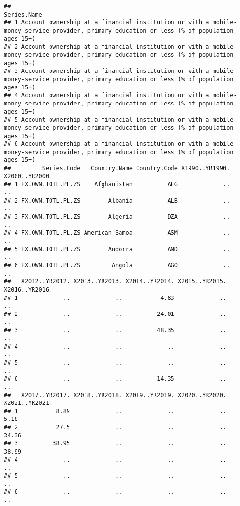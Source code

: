 \documentclass[
]{article}
\begin{document}
\begin{verbatim}
##                                                                                                                                  Series.Name
## 1 Account ownership at a financial institution or with a mobile-money-service provider, primary education or less (% of population ages 15+)
## 2 Account ownership at a financial institution or with a mobile-money-service provider, primary education or less (% of population ages 15+)
## 3 Account ownership at a financial institution or with a mobile-money-service provider, primary education or less (% of population ages 15+)
## 4 Account ownership at a financial institution or with a mobile-money-service provider, primary education or less (% of population ages 15+)
## 5 Account ownership at a financial institution or with a mobile-money-service provider, primary education or less (% of population ages 15+)
## 6 Account ownership at a financial institution or with a mobile-money-service provider, primary education or less (% of population ages 15+)
##         Series.Code   Country.Name Country.Code X1990..YR1990. X2000..YR2000.
## 1 FX.OWN.TOTL.PL.ZS    Afghanistan          AFG             ..             ..
## 2 FX.OWN.TOTL.PL.ZS        Albania          ALB             ..             ..
## 3 FX.OWN.TOTL.PL.ZS        Algeria          DZA             ..             ..
## 4 FX.OWN.TOTL.PL.ZS American Samoa          ASM             ..             ..
## 5 FX.OWN.TOTL.PL.ZS        Andorra          AND             ..             ..
## 6 FX.OWN.TOTL.PL.ZS         Angola          AGO             ..             ..
##   X2012..YR2012. X2013..YR2013. X2014..YR2014. X2015..YR2015. X2016..YR2016.
## 1             ..             ..           4.83             ..             ..
## 2             ..             ..          24.01             ..             ..
## 3             ..             ..          48.35             ..             ..
## 4             ..             ..             ..             ..             ..
## 5             ..             ..             ..             ..             ..
## 6             ..             ..          14.35             ..             ..
##   X2017..YR2017. X2018..YR2018. X2019..YR2019. X2020..YR2020. X2021..YR2021.
## 1           8.89             ..             ..             ..           5.18
## 2           27.5             ..             ..             ..          34.36
## 3          38.95             ..             ..             ..          38.99
## 4             ..             ..             ..             ..             ..
## 5             ..             ..             ..             ..             ..
## 6             ..             ..             ..             ..             ..
\end{verbatim}
\end{document}
